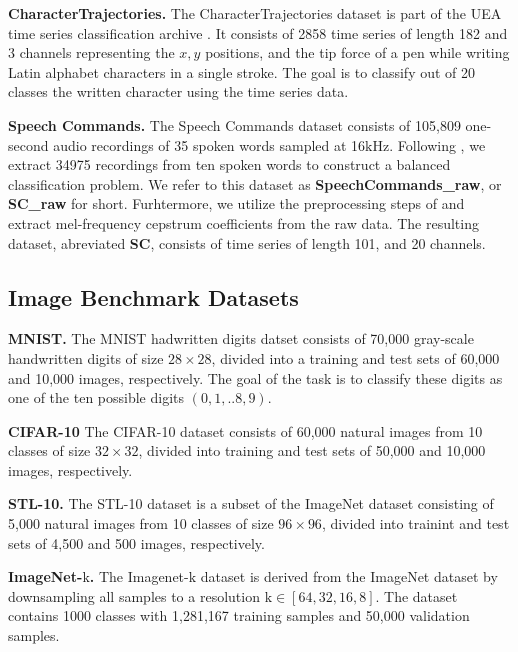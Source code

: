 \documentclass{article} \usepackage{iclr2022_conference,times}
\begin{document}
\textbf{CharacterTrajectories.} The CharacterTrajectories dataset is part of the UEA time series classification archive \citep{bagnall2018uea}. It consists of 2858 time series of length 182 and 3 channels representing the $x,y$ positions, and the tip force of a pen while writing Latin alphabet characters in a single stroke. The goal is to classify out of 20 classes the written character using the time series data. 

\textbf{Speech Commands.} The Speech Commands dataset \citep{warden2018speech} consists of 105,809 one-second audio recordings of 35 spoken words sampled at 16$\mathrm{kHz}$. Following \citet{kidger2020neural}, we extract 34975 recordings from ten spoken words to construct a balanced classification problem. We refer to this dataset as \textbf{SpeechCommands\_raw}, or \textbf{SC\_raw} for short. Furhtermore, we utilize the preprocessing steps of \citet{kidger2020neural} and extract mel-frequency cepstrum coefficients from the raw data. The resulting dataset, abreviated \textbf{SC}, consists of time series of length 101, and 20 channels.

\subsection{Image Benchmark Datasets}\label{appx:image_datsets}

\textbf{MNIST.} The MNIST hadwritten digits datset \citep{lecun-mnisthandwrittendigit-2010} consists of 70,000 gray-scale handwritten digits of size $28 {\times} 28$, divided into a training and test sets of 60,000 and 10,000 images, respectively. The goal of the task is to classify these digits as one of the ten possible digits $(0, 1, .. 8, 9)$.

\textbf{CIFAR-10} The CIFAR-10 dataset \citep{krizhevsky2009learning} consists of 60,000 natural images from 10 classes of size $32{\times}32$, divided into training and test sets of 50,000 and 10,000 images, respectively.

\textbf{STL-10.} The STL-10 dataset \citep{coates2011analysis} is a subset of the ImageNet dataset \citep{krizhevsky_imagenet_2012} consisting of 5,000 natural images from 10 classes of size $96{\times}96$, divided into trainint and test sets of 4,500 and 500 images, respectively.

\textbf{ImageNet-$\mathrm{k}$.} The Imagenet-$\mathrm{k}$ \citep{ChrabaszczLH17} dataset is derived from the ImageNet dataset \cite{ILSVRC15} by downsampling all samples to a resolution $\mathrm{k} \in [64, 32, 16, 8]$. The dataset contains 1000 classes with 1,281,167 training samples and 50,000 validation samples.
\end{document}

